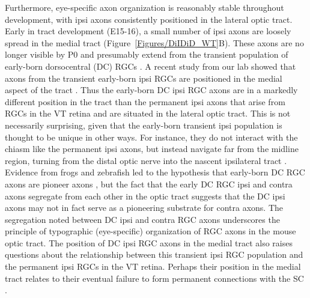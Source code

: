 Furthermore, eye-specific axon organization is reasonably stable throughout development, with ipsi axons consistently positioned in the lateral optic tract.
Early in tract development (E15-16), a small number of ipsi axons are loosely spread in the medial tract (Figure~\ref{Figures/DiIDiD_WT}B).
These axons are no longer visible by P0 and presumably extend from the transient population of early-born dorsocentral (DC) RGCs \cite{drager1985birth,soares2015transient}.
A recent study from our lab showed that axons from the transient early-born ipsi RGCs are positioned in the medial aspect of the tract \cite{soares2015transient}.
Thus the early-born DC ipsi RGC axons are in a markedly different position in the tract than the permanent ipsi axons that arise from RGCs in the VT retina and are situated in the lateral optic tract.
This is not necessarily surprising, given that the early-born transient ipsi population is thought to be unique in other ways.
For instance, they do not interact with the chiasm like the permanent ipsi axons, but instead navigate far from the midline region, turning from the distal optic nerve into the nascent ipsilateral tract \cite{godement1987study,marcus1995first,godement1990retinal}.
Evidence from frogs and zebrafish led to the hypothesis that early-born DC RGC axons are pioneer axons \cite{pittman2008pathfinding,holt1984does}, but the fact that the early DC RGC ipsi and contra axons segregate from each other in the optic tract \cite{soares2015transient} suggests that the DC ipsi axons may not in fact serve as a pioneering substrate for contra axons.
The segregation noted between DC ipsi and contra RGC axons underscores the principle of typographic (eye-specific) organization of RGC axons in the mouse optic tract.
The position of DC ipsi RGC axons in the medial tract also raises questions about the relationship between this transient ipsi RGC population and the permanent ipsi RGCs in the VT retina.
Perhaps their position in the medial tract relates to their eventual failure to form permanent connections with the SC \cite{soares2015transient}.

